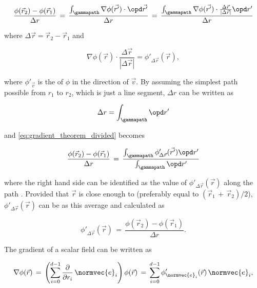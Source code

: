 \begin{equation} \label{eq:gradient_theorem_divided}
\frac{\phi(\vec{r}_2)-\phi(\vec{r}_1)}{\Delta r} \,=\, \frac{\int_\gammapath\nabla\phi(\vec{r'})\cdot \opd\vec{r'}}{\Delta r} \,=\, \frac{\int_\gammapath\nabla\phi(\vec{r'})\cdot\frac{\Delta\vec{r}}{|\Delta\vec{r}|} \opd r'}{\Delta r}
\end{equation}

where $\Delta\vec{r} = \vec{r}_2 -  \vec{r}_1$ and

\begin{equation}
\nabla\phi(\vec{r})\cdot\frac{\Delta\vec{r}}{|\Delta\vec{r}|} = \phi'_{\Delta\vec{r}}(\vec{r}),
\end{equation}

where $\phi'_{\vec{v}}$ is the \derivative of $\phi$ in the direction of $\vec{v}$. By assuming the simplest path possible from $r_1$ to $r_2$, which is just a line segment, $\Delta r$ can be written as

\begin{equation}
\Delta r = \int_\gammapath\opd r'
\end{equation}

and \eqref{eq:gradient_theorem_divided} becomes

\begin{equation} \label{eq:phi_derivative_integral}
\frac{\phi(\vec{r}_2)-\phi(\vec{r}_1)}{\Delta r} \,=\, \frac{\int_\gammapath\phi'_{\Delta\vec{r}}(\vec{r'})\opd r'}{\int_\gammapath\opd r'}
\end{equation}

where the right hand side can be identified as the \average value of $\phi'_{\Delta\vec{r}}(\vec{r})$ along the path \textgammapath. Provided that $\vec{r}$ is close enough to \textgammapath (preferably equal to \mbox{$(\vec{r}_1\,+\,\vec{r}_2)/2$}), $\phi'_{\Delta\vec{r}}(\vec{r})$ can be \approximated as this average and calculated as

\begin{equation} \label{eq:phi_derivative_final}
\phi'_{\Delta\vec{r}}(\vec{r}) \,=\, \frac{\phi(\vec{r}_2)-\phi(\vec{r}_1)}{\Delta r}.
\end{equation}

The gradient of a scalar field can be written as

\begin{equation} \label{eq:gradient_orthogonal}
\nabla\phi(\vec{r}) \,=\, \left(\sum_{i=0}^{d-1}\frac{\partial}{\partial r_i}\,\normvec{e}_i\right) \phi(\vec{r}) \,=\, \sum_{i=0}^{d-1}\phi'_{\normvec{e}_i}(\vec{r})\,\normvec{e}_i,
\end{equation}

